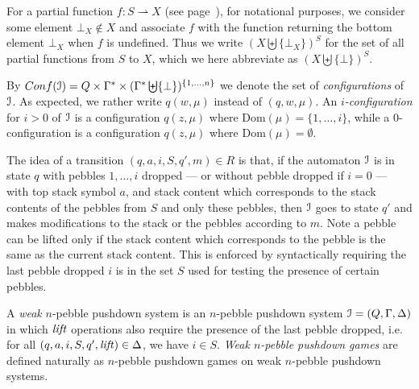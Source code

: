 \documentclass[a4paper,UKenglish,cleveref, autoref, thm-restate]{lipics-v2021}
\newcommand\mh[1]{\todo[inline,size=\scriptsize]{#1 - \textbf{Mathieu}}}
\newcommand{\Conf}{\mathsf{Conf}}
\begin{document}
For \fi a partial function $ f : S \rightharpoonup X $ (see page~\pageref{partial}), for notational purposes, we consider some element $\bot_X \not\in X$ and 
 associate $f$ with the function returning the 
bottom element $\bot_X$ when $f$ is undefined. Thus we write $(X \biguplus \{ \bot_X \})^S$ for the set of all partial functions from $S$ to $X$, which we here abbreviate as $(X \biguplus \{ \bot \})^S$. 


 
 
By $\Conf(\ppda)=Q\times \Gamma^* \times (\Gamma^* \biguplus \{ \bot \})^{\{1, \ldots, n\}}$ we denote the set of
{\em configurations} of $\mathcal{I}$. As expected, we rather write $q(w, \mu)$ instead of $(q, w, \mu)$.
An {\em$i$-configuration} for $i > 0$ of $\mathcal{I}$ is a configuration $q(z,\mu)$ where
$\text{Dom}(\mu) = \{1, \ldots, i\}$, while a $0$-configuration is a configuration 
 $q(z,\mu)$ where $\text{Dom}(\mu)=\emptyset$.



The idea of a transition $(q, a, i, S, q', m) \in R$
is that, if the automaton $\mathcal{I}$ is in state $q$ with pebbles $1,\ldots, i$ dropped \---- or without pebble dropped if $i = 0$ \---- with top stack symbol $a$, and stack content which corresponds to the stack contents of the pebbles from $S$ and only these pebbles, then
$\mathcal{I}$ goes to state 
$q'$ and makes modifications to the stack or the pebbles according to
$m$. 
Note a pebble 
can be lifted only if the stack content which corresponds to the pebble
is the same as the current stack content. 
This is enforced by syntactically requiring
the last pebble dropped $i$ is in the set $S$ used for testing the presence of certain pebbles.

\iffalse
A {\em weak} $n$-pebble pushdown system is an $n$-pebble pushdown system $\mathcal{I} = (Q, \Gamma,  \Delta )$ in which $\text{\textit{lift}}$ operations also require the presence of the last pebble dropped, i.e.
for all $(q, a, i, S, q', \text{\textit{lift}}) \in \Delta$, we have $ i \in S $. 
{\em Weak $n$-pebble pushdown games} are defined naturally as $n$-pebble pushdown games on 
weak $n$-pebble pushdown systems.
\end{document}

